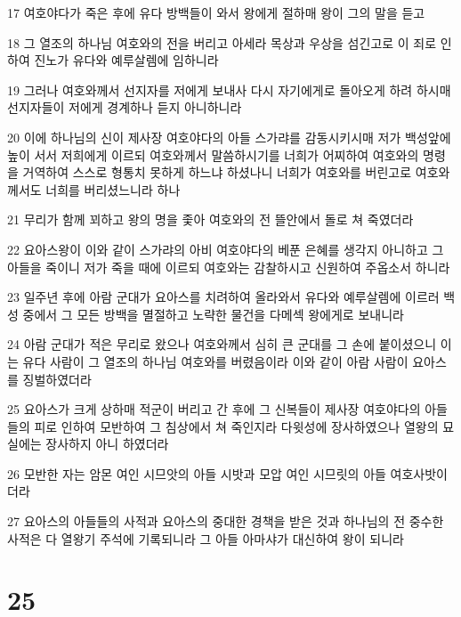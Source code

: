 \par 17 여호야다가 죽은 후에 유다 방백들이 와서 왕에게 절하매 왕이 그의 말을 듣고
\par 18 그 열조의 하나님 여호와의 전을 버리고 아세라 목상과 우상을 섬긴고로 이 죄로 인하여 진노가 유다와 예루살렘에 임하니라
\par 19 그러나 여호와께서 선지자를 저에게 보내사 다시 자기에게로 돌아오게 하려 하시매 선지자들이 저에게 경계하나 듣지 아니하니라
\par 20 이에 하나님의 신이 제사장 여호야다의 아들 스가랴를 감동시키시매 저가 백성앞에 높이 서서 저희에게 이르되 여호와께서 말씀하시기를 너희가 어찌하여 여호와의 명령을 거역하여 스스로 형통치 못하게 하느냐 하셨나니 너희가 여호와를 버린고로 여호와께서도 너희를 버리셨느니라 하나
\par 21 무리가 함께 꾀하고 왕의 명을 좇아 여호와의 전 뜰안에서 돌로 쳐 죽였더라
\par 22 요아스왕이 이와 같이 스가랴의 아비 여호야다의 베푼 은혜를 생각지 아니하고 그 아들을 죽이니 저가 죽을 때에 이르되 여호와는 감찰하시고 신원하여 주옵소서 하니라
\par 23 일주년 후에 아람 군대가 요아스를 치려하여 올라와서 유다와 예루살렘에 이르러 백성 중에서 그 모든 방백을 멸절하고 노략한 물건을 다메섹 왕에게로 보내니라
\par 24 아람 군대가 적은 무리로 왔으나 여호와께서 심히 큰 군대를 그 손에 붙이셨으니 이는 유다 사람이 그 열조의 하나님 여호와를 버렸음이라 이와 같이 아람 사람이 요아스를 징벌하였더라
\par 25 요아스가 크게 상하매 적군이 버리고 간 후에 그 신복들이 제사장 여호야다의 아들들의 피로 인하여 모반하여 그 침상에서 쳐 죽인지라 다윗성에 장사하였으나 열왕의 묘실에는 장사하지 아니 하였더라
\par 26 모반한 자는 암몬 여인 시므앗의 아들 시밧과 모압 여인 시므릿의 아들 여호사밧이더라
\par 27 요아스의 아들들의 사적과 요아스의 중대한 경책을 받은 것과 하나님의 전 중수한 사적은 다 열왕기 주석에 기록되니라 그 아들 아마샤가 대신하여 왕이 되니라

\chapter{25}


